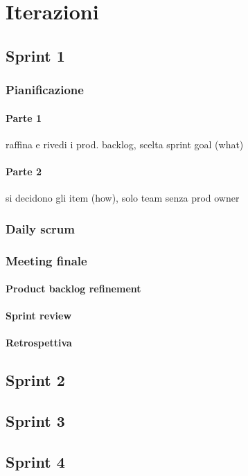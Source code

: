 \chapter{Iterazioni}

\section{Sprint 1}
    \subsection{Pianificazione}
        \subsubsection{Parte 1} 
            raffina e rivedi i prod. backlog, scelta sprint goal (what)
        \subsubsection{Parte 2}
            si decidono gli item (how), solo team senza prod owner
    \subsection{Daily scrum}
    \subsection{Meeting finale}
        \subsubsection{Product backlog refinement}
        \subsubsection{Sprint review}
        \subsubsection{Retrospettiva}

    
\section{Sprint 2}


\section{Sprint 3}


\section{Sprint 4}


